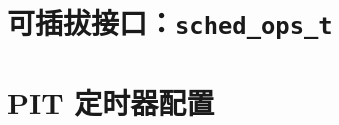 
\section{可插拔接口：\texttt{sched\_ops\_t}}
\label{sec:sched-interface}


\section{PIT 定时器配置}
\label{sec:sched-pit}


